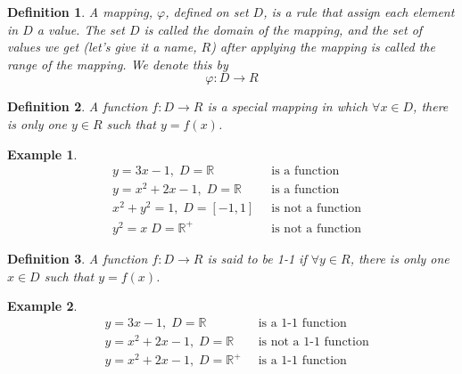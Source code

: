 \documentclass{article}
\newtheorem{definition}{Definition}
\newtheorem{ex}{Example}
\begin{document}
\begin{definition}
	A mapping, $\varphi$, defined on set $D$, is a rule that assign each element in $D$ a value. The set $D$ is called the domain of the mapping, and the set  of values we get (let's give it a name, $R$) after applying the mapping is called the range of the mapping. We denote this by
	\[ \varphi: D\to R \]
\end{definition}

\begin{definition}
	A function $f:D\to R$ is a special mapping in which $\forall x\in D$, there is only one $y\in R$ such that $y = f(x)$.
\end{definition}
\begin{ex}
	\begin{align*}
	&y=3x-1,\;D=\mathbb{R}\;\; &\text{is a function}\\
	&y= x^2+2x-1,\;D=\mathbb{R}\;\; &\text{is a function}\\
	&x^2+y^2 =1,\;D=[-1,1]\;\; &\text{is not a function}\\
	&y^2 = x\;D=\mathbb{R^+}\;\; &\text{is not a function}
	\end{align*}
\end{ex}

\begin{definition}
	A function $f:D\to R$ is said to be 1-1 if $\forall y\in R$, there is only one $x\in D$ such that $y = f(x)$. 
\end{definition}

\begin{ex}
	\begin{align*}
	&y=3x-1,\;D=\mathbb{R}\;\; &\text{is a 1-1 function}\\
	&y= x^2+2x-1,\;D=\mathbb{R}\;\; &\text{is not a 1-1 function}\\
	&y= x^2+2x-1,\;D=\mathbb{R^+}\;\; &\text{is a 1-1 function}\\
	\end{align*}
\end{ex}
\end{document}
